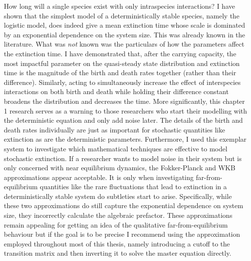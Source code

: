 How long will a single species exist with only intraspecies interactions? 
I have shown that the simplest model of a deterministically stable species, namely the logistic model, does indeed give a mean extinction time whose scale is dominated by an exponential dependence on the system size. 
This was already known in the literature. 
What was \emph{not} known was the particulars of how the parameters affect the extinction time. 
I have demonstrated that, after the carrying capacity, the most impactful parameter on the quasi-steady state distribution and extinction time is the magnitude of the birth and death rates together (rather than their difference). 
Similarly, acting to simultaneously increase the effect of interspecies interactions on both birth and death while holding their difference constant broadens the distribution and decreases the time. 
More significantly, this chapter 1 research serves as a warning to those researchers who start their modelling with the deterministic equation and only add noise later. 
The details of the birth and death rates individually are just as important for stochastic quantities like extinction as are the deterministic parameters. 
Furthermore, I used this exemplar system to investigate which mathematical techniques are effective to model stochastic extinction. 
If a researcher wants to model noise in their system but is only concerned with near equilibrium dynamics, the Fokker-Planck and WKB approximations appear acceptable. 
It is only when investigating far-from-equilibrium quantities like the rare fluctuations that lead to extinction in a deterministically stable system do subtleties start to arise. 
Specifically, while these two approximations do still capture the exponential dependence on system size, they incorrectly calculate the algebraic prefactor. 
These approximations remain appealing for getting an idea of the qualitative far-from-equilibrium behaviour but if the goal is to be precise I recommend using the approximation employed throughout most of this thesis, namely introducing a cutoff to the transition matrix and then inverting it to solve the master equation directly. %

